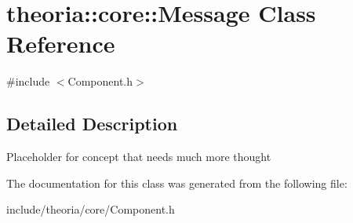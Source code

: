 \hypertarget{classtheoria_1_1core_1_1Message}{}\section{theoria\+:\+:core\+:\+:Message Class Reference}
\label{classtheoria_1_1core_1_1Message}


{\ttfamily \#include $<$Component.\+h$>$}



\subsection{Detailed Description}
Placeholder for concept that needs much more thought 

The documentation for this class was generated from the following file\+:\begin{DoxyCompactItemize}
\item 
include/theoria/core/Component.\+h\end{DoxyCompactItemize}
